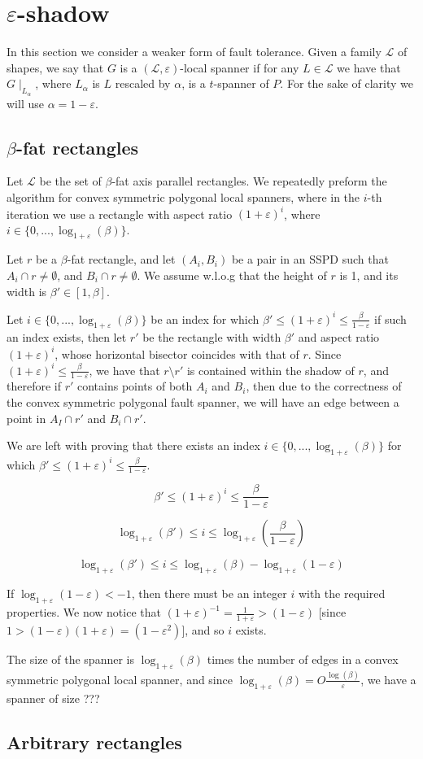 \documentclass{article}
\newcommand{\eps}{\varepsilon}
\newcommand{\LL}{\mathcal{L}}
\begin{document}
	\section{$\eps$-shadow}
	
	In this section we consider a weaker form of fault tolerance. Given a family $\LL$ of shapes, we say that $G$ is a $(\LL,\eps)$-local spanner if for any $L\in\LL$ we have that $G\mid_{L_{\alpha}}$, where $L_{\alpha}$ is $L$ rescaled by $\alpha$, is a $t$-spanner of $P$. For the sake of clarity we will use $\alpha = 1-\eps$.
	
	\subsection{$\beta$-fat rectangles}
	Let $\LL$ be the set of $\beta$-fat axis parallel rectangles. We repeatedly preform the algorithm for convex symmetric polygonal local spanners, where in the $i$-th iteration we use a rectangle with aspect ratio $\left(1+\eps\right)^i$, where $i\in\{0,...,\log_{1+\eps}(\beta)\}$. 
	
	Let $r$ be a $\beta$-fat rectangle, and let $(A_i,B_i)$ be a pair in an SSPD such that $A_i\cap r\neq \emptyset$, and $B_i\cap r\neq \emptyset$. We assume w.l.o.g that the height of $r$ is 1, and its width is $\beta'\in [1,\beta]$.

	Let $i\in \{0,...,\log_{1+\eps}(\beta)\}$ be an index for which $\beta' \leq (1+\eps)^i \leq \frac{\beta}{1-\eps}$ if such an index exists, then let $r'$ be the rectangle with width $\beta'$ and aspect ratio $(1+\eps)^i$, whose horizontal bisector coincides with that of $r$. Since $(1+\eps)^i \leq \frac{\beta}{1-\eps}$, we have that $r\setminus r'$ is contained within the shadow of $r$, and therefore if $r'$ contains points of both $A_i$ and $B_i$, then due to the correctness of the convex symmetric polygonal fault spanner, we will have an edge between a point in $A_I\cap r'$ and $B_i\cap r'$.
	
	We are left with proving that there exists an index $i\in \{0,...,\log_{1+\eps}(\beta)\}$ for which $\beta' \leq (1+\eps)^i \leq \frac{\beta}{1-\eps}$.
	
	$$\beta' \leq (1+\eps)^i \leq \frac{\beta}{1-\eps}$$
	
	$$\log_{1+\eps}(\beta') \leq i \leq \log_{1+\eps}\left(\frac{\beta}{1-\eps}\right)$$
	
	$$\log_{1+\eps}(\beta') \leq i \leq \log_{1+\eps}(\beta) - \log_{1+\eps}(1-\eps)$$
	
	If $\log_{1+\eps}(1-\eps)<-1$, then there must be an integer $i$ with the required properties. We now notice that $(1+\eps)^{-1}=\frac{1}{1+\eps}>(1-\eps)$ [since $1>(1-\eps)(1+\eps)=(1-\eps^2)$], and so $i$ exists.
	
	The size of the spanner is $\log_{1+\eps}(\beta)$ times the number of edges in a convex symmetric polygonal local spanner, and since $\log_{1+\eps}(\beta)=O\frac{\log(\beta)}{\eps}$, we have a spanner of size ???
	
	
	\subsection{Arbitrary rectangles}
	
	
\end{document}
